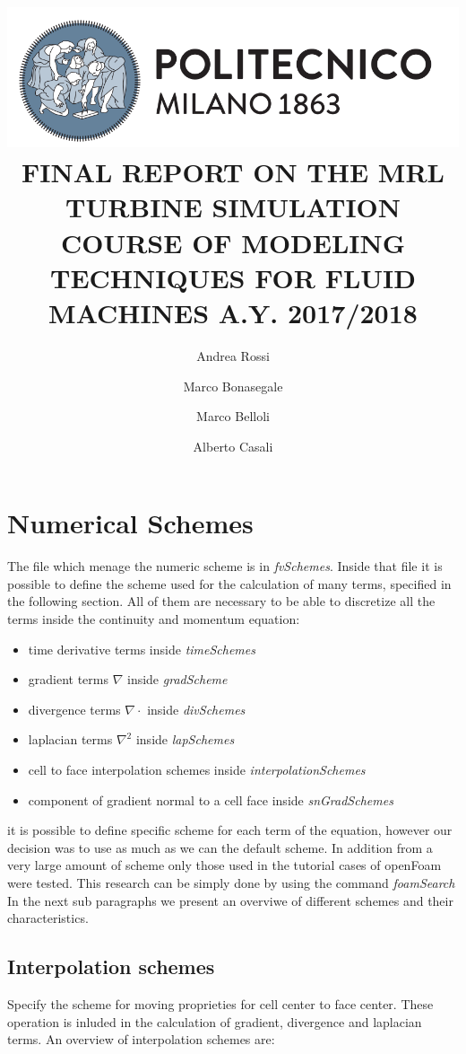 \documentclass[a4paper,12pt]{article}
\title{
\includegraphics[scale=0.4]{images/logo.png}
\\[1cm]
FINAL REPORT ON THE  MRL TURBINE SIMULATION
COURSE OF MODELING TECHNIQUES FOR FLUID MACHINES 
A.Y. 2017/2018}
\author{
Andrea Rossi \and Marco Bonasegale
\and Marco Belloli \and Alberto Casali 
}
\date{}
\begin{document}
\maketitle

\newpage

\tableofcontents

\newpage




\section{Numerical Schemes}
The file which menage the numeric scheme is in \textit{fvSchemes}. Inside that file it is possible to define the scheme used for the calculation of many terms, specified in the following section. All of them are necessary to be able to discretize all the terms inside the continuity and momentum equation:
\begin{itemize} 
 \item time derivative terms inside \textit{timeSchemes}
 \item gradient terms $\nabla$ inside \textit{gradScheme}
 \item divergence terms $\nabla\cdot $ inside \textit{divSchemes}
 \item laplacian terms $\nabla^2$ inside \textit{lapSchemes}
 \item cell to face interpolation schemes  inside \textit{interpolationSchemes}
 \item component of gradient normal to a cell face  inside \textit{snGradSchemes}
 \end{itemize} 
it is possible to define specific scheme for each term of the equation, however our decision was to use as much as we can the default scheme. In addition from a very large amount of scheme only those used in the tutorial cases of openFoam were tested. This research can be simply done by using the command \textit{foamSearch} 
In the next sub paragraphs we present an overviwe of different schemes and their characteristics.

\subsection{Interpolation schemes}
Specify the scheme for moving proprieties for cell center to face center. These operation is inluded in the calculation of gradient, divergence and laplacian terms. An overview of interpolation schemes are:
\end{document}
